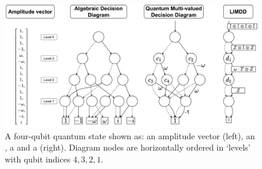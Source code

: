 \begin{figure}[bh!]
	\includegraphics[width=\textwidth]{pics/qmdd-isoqmdd-example-4-qubits-new-notation.pdf}
	\caption{A four-qubit quantum state shown as: an amplitude vector (left), an \add, a \qmdd and a \limdd (right). Diagram nodes are horizontally ordered in `levels' with qubit indices ${4,3,2,1}$.}
	\label{fig:qmdd-isoqmdd-exposition}
\end{figure}




